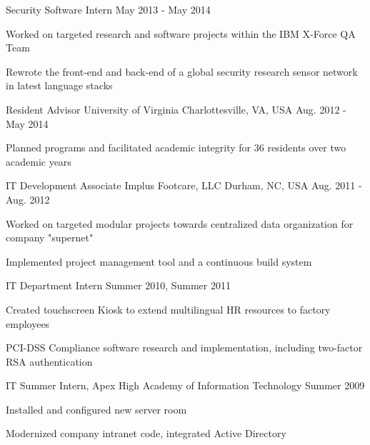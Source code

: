 \begin{cventries}
  \cventry
    {Security Software Intern}
    {}
    {}
    {May 2013 - May 2014}
    {
    \begin{cvitems}
      \item {Worked on targeted research and software projects within the IBM X-Force QA Team}
      \item {Rewrote the front-end and back-end of a global security research sensor network in latest language stacks}
    \end{cvitems}
    }

  \cventry
    {Resident Advisor}
    {University of Virginia}
    {Charlottesville, VA, USA}
    {Aug. 2012 - May 2014}
    {
      \begin{cvitems}
	      \item {Planned programs and facilitated academic integrity for 36 residents over two academic years}
      \end{cvitems}
    }

  \cventry
    {IT Development Associate}
    {Implus Footcare, LLC}
    {Durham, NC, USA}
    {Aug. 2011 - Aug. 2012}
    {
      \begin{cvitems}
        \item Worked on targeted modular projects towards centralized data organization for company "supernet"
        \item Implemented project management tool and a continuous build system
      \end{cvitems}
    }

  \cventry
  {IT Department Intern}
  {}
  {}
  {Summer 2010, Summer 2011}
  {
    \begin{cvitems}
      \item Created touchscreen Kiosk to extend multilingual HR resources to factory employees
      \item PCI-DSS Compliance software research and implementation, including two-factor RSA authentication
    \end{cvitems}
  }

  \cventry
  {IT Summer Intern, Apex High Academy of Information Technology}
  {}
  {}
  {Summer 2009}
  {
    \begin{cvitems}
      \item Installed and configured new server room
      \item Modernized company intranet code, integrated Active Directory
    \end{cvitems}
  }

\end{cventries}
